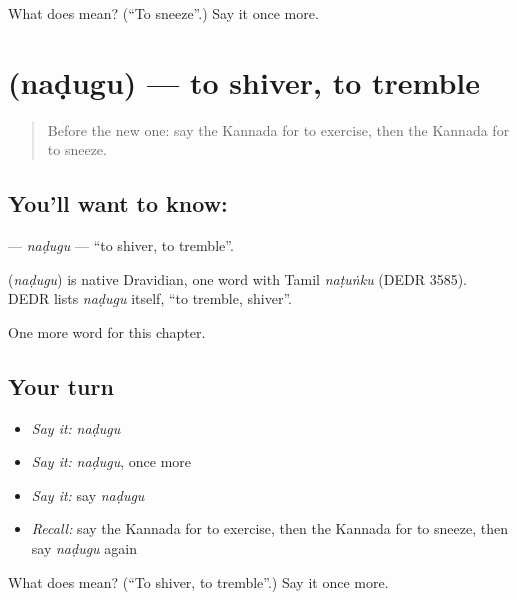 \begin{tcolorbox}[breakable,colback=teal!4,colframe=teal!35!black,title={Before you move on}]
What does  mean? (\textquotedblleft{}To sneeze\textquotedblright{}.) Say it once more.
\end{tcolorbox}
\section[\texorpdfstring{\kn{ನಡುಗು} (naḍugu)}{ನಡುಗು (naḍugu)}]{ (naḍugu) — to shiver, to tremble}

\label{lesson:KA-C160-nadugu}



\begin{quote}
Before the new one: say the Kannada for to exercise, then the Kannada for to sneeze.
\end{quote}

\subsection*{You'll want to know: }
\textbf{} — \emph{naḍugu} — \textquotedblleft{}to shiver, to tremble\textquotedblright{}.

\begin{cousinweb}
\textbf{} (\emph{naḍugu}) is native Dravidian, one word with Tamil \emph{naṭuṅku} (DEDR 3585). DEDR lists \emph{naḍugu} itself, \textquotedblleft{}to tremble, shiver\textquotedblright{}.
\end{cousinweb}

\begin{grammarlens}[title={What you've built}]
One more word for this chapter.
\end{grammarlens}

\subsection*{Your turn}
\begin{itemize}
\raggedright
  \item \emph{Say it:} \emph{naḍugu}
  \item \emph{Say it:} \emph{naḍugu}, once more
  \item \emph{Say it:} say \emph{naḍugu}
  \item \emph{Recall:} say the Kannada for to exercise, then the Kannada for to sneeze, then say \emph{naḍugu} again
\end{itemize}

\begin{tcolorbox}[breakable,colback=teal!4,colframe=teal!35!black,title={Before you move on}]
What does  mean? (\textquotedblleft{}To shiver, to tremble\textquotedblright{}.) Say it once more.
\end{tcolorbox}
